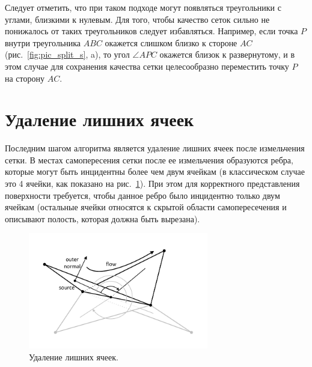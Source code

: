\documentclass[
11pt,%
tightenlines,%
twoside,%
onecolumn,%
nofloats,%
nobibnotes,%
nofootinbib,%
superscriptaddress,%
noshowpacs,%
centertags]%
{revtex4}
\begin{document}
Следует отметить, что при таком подходе могут появляться треугольники с углами, близкими к нулевым.
Для того, чтобы качество сеток сильно не понижалось от таких треугольников следует избавляться.
Например, если точка $P$ внутри треугольника $ABC$ окажется слишком близко к стороне $AC$ (рис.~\ref{fig:pic_split_s}, a), то угол $\angle APC$ окажется близок к развернутому, и в этом случае для сохранения качества сетки целесообразно переместить точку $P$ на сторону $AC$.

\section{Удаление лишних ячеек}

Последним шагом алгоритма является удаление лишних ячеек после измельчения сетки.
В местах самопересения сетки после ее измельчения образуются ребра, которые могут быть инцидентны более чем двум ячейкам (в классическом случае это 4 ячейки, как показано на рис.~\ref{fig:pic_del_extra_s}).
При этом для корректного представления поверхности требуется, чтобы данное ребро было инцидентно только двум ячейкам (остальные ячейки относятся к скрытой области самопересечения и описывают полость, которая должна быть вырезана).

\begin{figure}[h]
\includegraphics[width=0.7\textwidth]{pics/pic_del_extra_s.pdf}
\caption{Удаление лишних ячеек.}\label{fig:pic_del_extra_s}
\end{figure}
\end{document}
